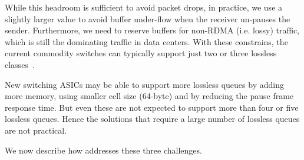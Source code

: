 While this headroom is sufficient to avoid packet drops, in practice, we use a
slightly larger value to avoid buffer under-flow when the receiver un-pauses the
sender.  Furthermore, we need to reserve buffers for non-RDMA (i.e. lossy)
traffic, which is still the dominating traffic in data centers. With these
constrains, the current commodity switches can typically support just two or
three lossless classes~\cite{rdmaatscale}.

New switching ASICs may be able to support more lossless queues by adding more
memory, using smaller cell size (64-byte) and by reducing the pause frame
response time. But even these are not expected to support more than four or five
lossless queues. Hence the solutions that require a large number of lossless
queues are not practical.

We now describe how \sysname{} addresses these three challenges.
